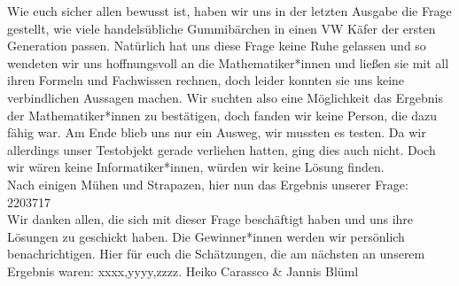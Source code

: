 {Wie euch sicher allen bewusst ist, haben wir uns in der letzten Ausgabe die
    Frage gestellt, wie viele handelsübliche Gummibärchen in einen VW Käfer der
    ersten Generation passen. Natürlich hat uns diese Frage keine Ruhe gelassen und
    so wendeten wir uns hoffnungsvoll an die Mathematiker*innen und ließen sie mit
    all ihren Formeln und Fachwissen rechnen, doch leider konnten sie uns keine
    verbindlichen Aussagen machen. Wir suchten also eine Möglichkeit das Ergebnis
    der Mathematiker*innen zu bestätigen, doch fanden wir keine Person, die dazu
    fähig war. Am Ende blieb uns nur ein Ausweg, wir mussten es testen. Da wir
    allerdings unser Testobjekt gerade verliehen hatten, ging dies auch nicht. Doch
    wir wären keine Informatiker*innen, würden wir keine Lösung finden. \\

    Nach einigen Mühen und Strapazen, hier nun das Ergebnis unserer Frage: 2203717 \\

    Wir danken allen, die sich mit dieser Frage beschäftigt haben und uns ihre
    Lösungen zu geschickt haben. Die Gewinner*innen werden wir persönlich benachrichtigen. Hier für euch die Schätzungen, die am nächsten an unserem Ergebnis waren: xxxx,yyyy,zzzz.}
{Heiko Carassco \& Jannis Blüml}

